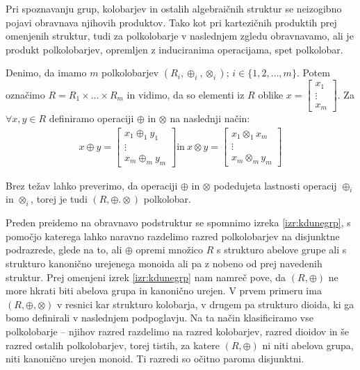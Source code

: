 \documentclass[mat1]{fmfdelo}
\begin{document}
Pri spoznavanju grup, kolobarjev in ostalih algebraičnih struktur se neizogibno pojavi obravnava njihovih produktov. Tako kot pri kartezičnih produktih prej omenjenih struktur, tudi za polkolobarje v naslednjem zgledu obravnavamo, ali je produkt polkolobarjev, opremljen z induciranima operacijama, spet polkolobar. 

\begin{zgled}
	\label{zgled:prodpolkolobar}
Denimo, da imamo $m$ polkolobarjev $(R_{i}, \oplus_{i}, \otimes_{i})$; $i\in \{1, 2, \ldots, m\}$. Potem označimo $R = R_1 \times \ldots \times R_m$ in vidimo, da so elementi iz $R$ oblike $x = \begin{bmatrix}
	x_1 \\
	\vdots \\
	x_m
\end{bmatrix}$. Za $\forall x, y\in R$ definiramo operaciji $\oplus$ in $\otimes$ na naslednji način:
\begin{align*}
	x \oplus y = \begin{bmatrix}
		x_1 \oplus_{1} y_1 \\
		\vdots \\
		x_m \oplus_{m} y_m
	\end{bmatrix} \text{in}~ x \otimes y = \begin{bmatrix}
		x_1 \otimes_{1} x_m \\
		\vdots \\
		x_m \otimes_{m} y_m
	\end{bmatrix}
\end{align*}

Brez težav lahko preverimo, da operaciji $\oplus$ in $\otimes$ podedujeta lastnosti operacij $\oplus_{i}$ in $\otimes_{i}$, torej je tudi $(R, \oplus. \otimes)$ polkolobar.
\end{zgled}

Preden preidemo na obravnavo podstruktur se spomnimo izreka \ref{izr:kdunegrp}, s pomočjo katerega lahko naravno razdelimo razred polkolobarjev na disjunktne podrazrede, glede na to, ali $\oplus$ opremi množico $R$ s strukturo abelove grupe ali s strukturo kanonično urejenega monoida ali pa z nobeno od prej navedenih struktur. Prej omenjeni izrek \ref{izr:kdunegrp} nam namreč pove, da $(R, \oplus)$ ne more hkrati biti abelova grupa in kanonično urejen. V prvem primeru ima $(R, \oplus, \otimes)$ v resnici kar strukturo kolobarja, v drugem pa strukturo dioida, ki ga bomo definirali v naslednjem podpoglavju.
Na ta način klasificiramo vse polkolobarje -- njihov razred razdelimo na razred kolobarjev, razred dioidov in še razred ostalih polkolobarjev, torej tistih, za katere $(R, \oplus)$ ni niti abelova grupa, niti kanonično urejen monoid. Ti razredi so očitno paroma disjunktni.
\end{document}
